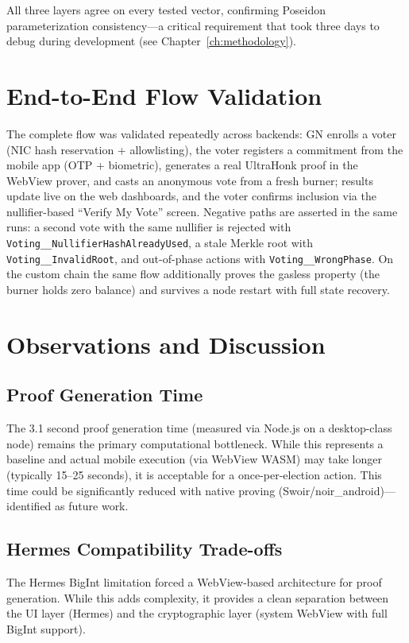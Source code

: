 All three layers agree on every tested vector, confirming Poseidon parameterization consistency---a critical requirement that took three days to debug during development (see Chapter~\ref{ch:methodology}).

\section{End-to-End Flow Validation}\label{sec:e2e-flow}

The complete flow was validated repeatedly across backends: GN enrolls a voter (NIC hash reservation + allowlisting), the voter registers a commitment from the mobile app (OTP + biometric), generates a real UltraHonk proof in the WebView prover, and casts an anonymous vote from a fresh burner; results update live on the web dashboards, and the voter confirms inclusion via the nullifier-based ``Verify My Vote'' screen. Negative paths are asserted in the same runs: a second vote with the same nullifier is rejected with \texttt{Voting\_\_NullifierHashAlreadyUsed}, a stale Merkle root with \texttt{Voting\_\_InvalidRoot}, and out-of-phase actions with \texttt{Voting\_\_WrongPhase}. On the custom chain the same flow additionally proves the gasless property (the burner holds zero balance) and survives a node restart with full state recovery.

\section{Observations and Discussion}

\subsection{Proof Generation Time}

The 3.1 second proof generation time (measured via Node.js on a desktop-class node) remains the primary computational bottleneck. While this represents a baseline and actual mobile execution (via WebView WASM) may take longer (typically 15--25 seconds), it is acceptable for a once-per-election action. This time could be significantly reduced with native proving (Swoir/noir\_android)---identified as future work.

\subsection{Hermes Compatibility Trade-offs}

The Hermes BigInt limitation forced a WebView-based architecture for proof generation. While this adds complexity, it provides a clean separation between the UI layer (Hermes) and the cryptographic layer (system WebView with full BigInt support).


